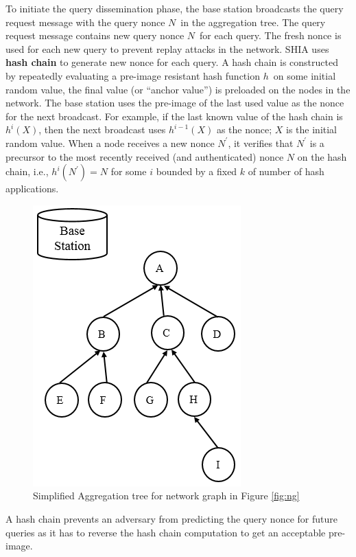 	To initiate the query dissemination phase, the base station broadcasts the query request message with the query nonce $N$\ in the aggregation tree. 
	The query request message contains new query nonce $N$\ for each query.
	The fresh nonce is used for each new query to prevent replay attacks in the network.
	SHIA uses \textbf{hash chain} to generate new nonce for each query. 
	A hash chain is constructed by repeatedly evaluating a pre-image resistant hash function $h$\ on some initial random value, the final value (or ``anchor value'') is preloaded on the nodes in the network.
	The base station uses the pre-image of the last used  value as the nonce for the next broadcast.
	For example, if the last known value of the hash chain is $h^i(X)$, then the next broadcast uses $h^{i-1}(X)$ as the nonce; $X$ is the initial random value.
	When a node receives a new nonce $N^{'}$, it verifies that $N^{'}$ is a precursor to the most recently received (and authenticated) nonce $N$ on the hash chain, i.e., $h^{i}(N^{'}) = N$ for some $i$ bounded by a fixed $k$ of number of hash applications.
	\begin{figure}[h]
		\centering
		\includegraphics[scale = 1]{images/aggregation-tree.png}
		\caption{Simplified Aggregation tree for network graph in Figure \ref{fig:ng}}
		\label{fig:at}
	\end{figure}		
	A hash chain prevents an adversary from predicting the query nonce for future queries as it has to reverse the hash chain computation to get an acceptable pre-image.

